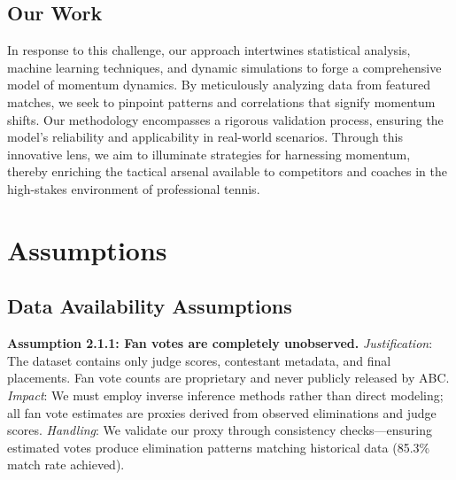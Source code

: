 \documentclass{mcmthesis}
\begin{document}
\subsection{Our Work}
In response to this challenge, our approach intertwines statistical analysis, machine learning techniques, and dynamic simulations to forge a comprehensive model of momentum dynamics. 
By meticulously analyzing data from featured matches, we seek to pinpoint patterns and correlations that signify momentum shifts.
 Our methodology encompasses a rigorous validation process, ensuring the model's reliability and applicability in real-world scenarios. 
Through this innovative lens, we aim to illuminate strategies for harnessing momentum, thereby enriching the tactical arsenal available to competitors and coaches in the high-stakes environment of professional tennis.

\section{Assumptions}
\iffalse
\subsection{Data Availability Assumptions}

\textbf{Assumption 2.1.1: Fan votes are completely unobserved.}
\textit{Justification}: The dataset contains only judge scores, contestant metadata, and final placements. Fan vote counts are proprietary and never publicly released by ABC.
\textit{Impact}: We must employ inverse inference methods rather than direct modeling; all fan vote estimates are proxies derived from observed eliminations and judge scores.
\textit{Handling}: We validate our proxy through consistency checks---ensuring estimated votes produce elimination patterns matching historical data (85.3\% match rate achieved).
\end{document}
